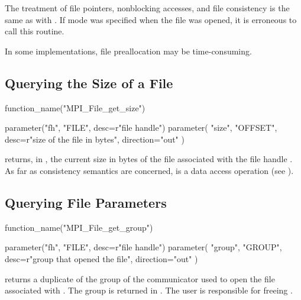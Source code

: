 The treatment of
file pointers, nonblocking accesses, and file consistency
is the same as with .
If  mode was specified when the file was opened,
it is erroneous to call this routine.

\begin{users}
In some implementations,
file preallocation may be time-consuming.
\end{users}

\subsection{Querying the Size of a File}
\label{sec:io-filecntl-get-size}

%
%
\begin{mpi-binding}
    function_name("MPI_File_get_size")
    
    parameter("fh", "FILE", desc=r"file handle")
    parameter(
        "size", "OFFSET", desc=r"size of the file in bytes", direction="out"
    )
\end{mpi-binding}

 returns, in ,
the current size in bytes
of the file associated with the file handle .
As far as consistency semantics are concerned,
 is a data access operation
(see ).

\subsection{Querying File Parameters}
\label{sec:io-filecntl-get-params}

%
%
\begin{mpi-binding}
    function_name("MPI_File_get_group")
    
    parameter("fh", "FILE", desc=r"file handle")
    parameter(
        "group", "GROUP", desc=r"group that opened the file", direction="out"
    )
\end{mpi-binding}

 returns
a duplicate of
the group
of the communicator used to open the file
associated with
.
The group is returned in .	
The user is responsible for freeing .

